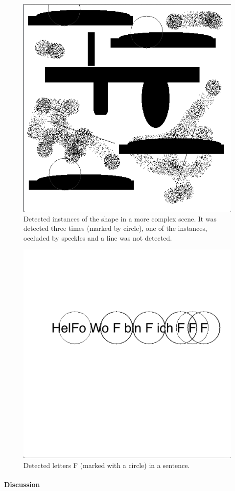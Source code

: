 \documentclass[11pt,a4paper]{article}
\begin{document}
\begin{figure}
\centering
\includegraphics[scale=.4]{img/matchShape.png}

\caption{Detected instances of the shape in a more complex scene. It was detected three times (marked by circle), one of the instances, occluded by speckles and a line was not detected.  }
\label{fig:6}
\end{figure}

\begin{figure}
\centering
\includegraphics[scale=.4]{img/matchLetter.png}

\caption{Detected letters F (marked with a circle) in a sentence. }
\label{fig:7}
\end{figure}

\paragraph{Discussion}
\end{document}
